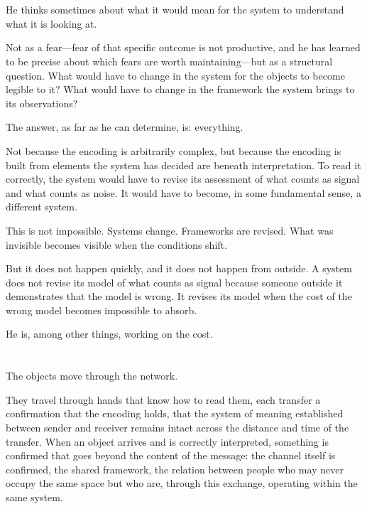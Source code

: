 \section{}

He thinks sometimes about what it would mean for the system
to understand what it is looking at.

Not as a fear---fear of that specific outcome is not productive,
and he has learned to be precise about which fears are worth
maintaining---but as a structural question. What would have
to change in the system for the objects to become legible to
it? What would have to change in the framework the system
brings to its observations?

The answer, as far as he can determine, is: everything.

Not because the encoding is arbitrarily complex, but because
the encoding is built from elements the system has decided
are beneath interpretation. To read it correctly, the system
would have to revise its assessment of what counts as signal
and what counts as noise. It would have to become, in some
fundamental sense, a different system.

This is not impossible. Systems change. Frameworks are revised.
What was invisible becomes visible when the conditions shift.

But it does not happen quickly, and it does not happen from
outside. A system does not revise its model of what counts
as signal because someone outside it demonstrates that the
model is wrong. It revises its model when the cost of the
wrong model becomes impossible to absorb.

He is, among other things, working on the cost.

\section{}

The objects move through the network.

They travel through hands that know how to read them, each
transfer a confirmation that the encoding holds, that the
system of meaning established between sender and receiver
remains intact across the distance and time of the transfer.
When an object arrives and is correctly interpreted, something
is confirmed that goes beyond the content of the message:
the channel itself is confirmed, the shared framework, the
relation between people who may never occupy the same space
but who are, through this exchange, operating within the
same system.

